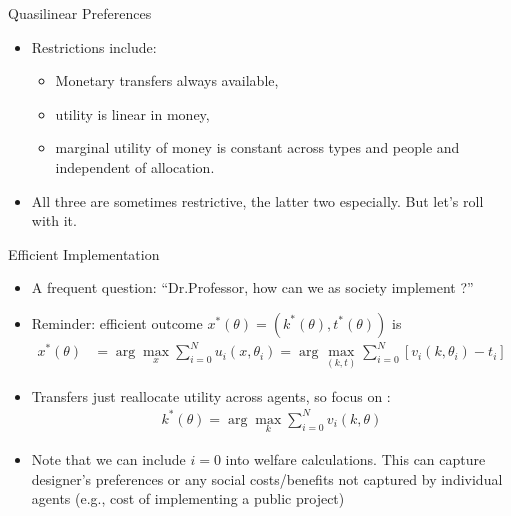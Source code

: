 \documentclass[english,10pt
,aspectratio=169
]{beamer}
\begin{document}
\begin{frame}{Quasilinear Preferences}
\begin{itemize}
	\item Restrictions include:
	\begin{itemize}
		\item Monetary transfers always available,
		\item utility is linear in money,
		\item marginal utility of money is constant across types and people and independent of allocation.
	\end{itemize}
	\item All three are sometimes restrictive, the latter two especially. But let's roll with it.
\end{itemize}
\end{frame}


\begin{frame}{Efficient Implementation}
\begin{itemize}
	\item A frequent question: ``Dr.Professor, how can we as society implement ?''
	\item Reminder: efficient outcome $x^*(\theta) = (k^*(\theta),t^*(\theta))$ is 
	\vspace{-0.5em}\begin{align*}
	x^*(\theta) &= \arg \max_x \sum_{i=0}^N u_i(x,\theta_i) 
	= \arg \max_{(k,t)} \sum_{i=0}^N \left[v_i(k,\theta_i) - t_i\right]
	\end{align*}
	\item Transfers just reallocate utility across agents, so focus on :
	\vspace{-1em}\begin{align*}
	k^*(\theta) = \arg \max_k \sum_{i=0}^N v_i(k,\theta)
	\end{align*}
	\item Note that we can include $i=0$ into welfare calculations. This can capture designer's preferences or any social costs/benefits not captured by individual agents (e.g., cost of implementing a public project)
\end{itemize}
\end{frame}
\end{document}

